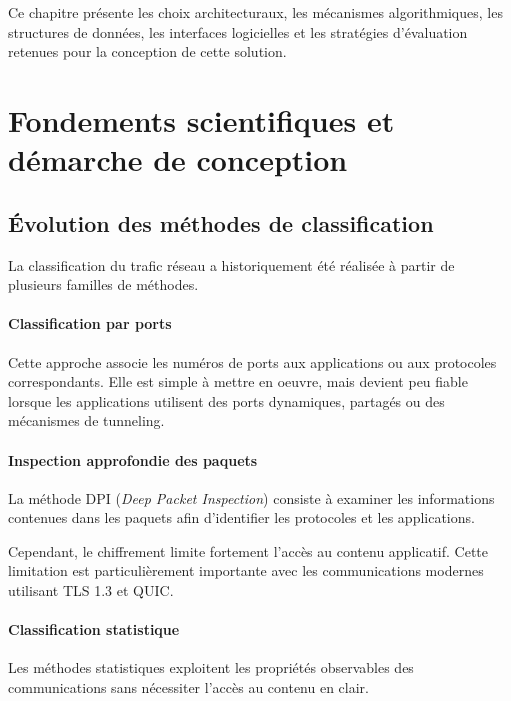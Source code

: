 Ce chapitre présente les choix architecturaux, les
mécanismes algorithmiques, les structures de données,
les interfaces logicielles et les stratégies d'évaluation
retenues pour la conception de cette solution.

\section{Fondements scientifiques et démarche de conception}

\subsection{Évolution des méthodes de classification}

La classification du trafic réseau a historiquement
été réalisée à partir de plusieurs familles de méthodes.

\paragraph{Classification par ports}

Cette approche associe les numéros de ports aux applications
ou aux protocoles correspondants. Elle est simple à mettre
en oeuvre, mais devient peu fiable lorsque les applications
utilisent des ports dynamiques, partagés ou des mécanismes
de tunneling.

\paragraph{Inspection approfondie des paquets}

La méthode DPI (\textit{Deep Packet Inspection}) consiste
à examiner les informations contenues dans les paquets
afin d'identifier les protocoles et les applications.

Cependant, le chiffrement limite fortement l'accès au
contenu applicatif. Cette limitation est particulièrement
importante avec les communications modernes utilisant
TLS 1.3 et QUIC.

\paragraph{Classification statistique}

Les méthodes statistiques exploitent les propriétés
observables des communications sans nécessiter
l'accès au contenu en clair.

